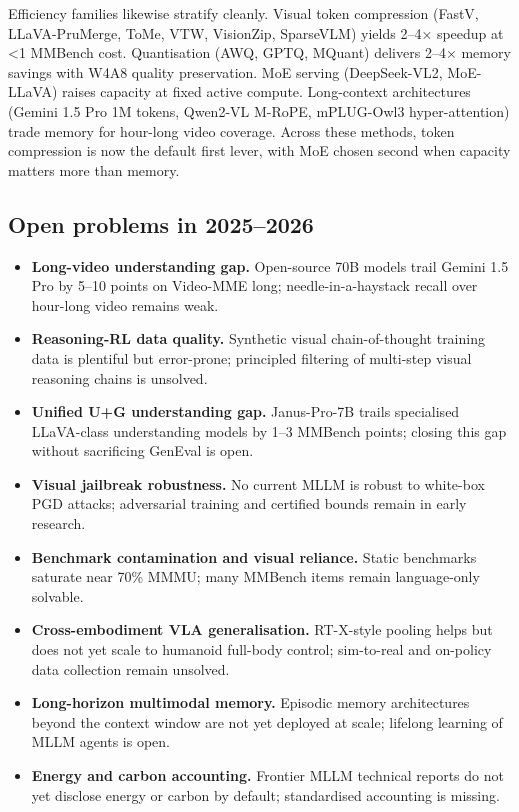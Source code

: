 Efficiency families likewise stratify cleanly. Visual token compression (FastV, LLaVA-PruMerge, ToMe, VTW, VisionZip, SparseVLM) yields 2--4× speedup at \textless1 MMBench cost. Quantisation (AWQ, GPTQ, MQuant) delivers 2--4× memory savings with W4A8 quality preservation. MoE serving (DeepSeek-VL2, MoE-LLaVA) raises capacity at fixed active compute. Long-context architectures (Gemini 1.5 Pro 1M tokens, Qwen2-VL M-RoPE, mPLUG-Owl3 hyper-attention) trade memory for hour-long video coverage. Across these methods, token compression is now the default first lever, with MoE chosen second when capacity matters more than memory.

\subsection{Open problems in 2025--2026}\label{open-problems-in-20252026}

\begin{itemize}
\tightlist
\item
  \textbf{Long-video understanding gap.} Open-source 70B models trail Gemini 1.5 Pro by 5--10 points on Video-MME long; needle-in-a-haystack recall over hour-long video remains weak.
\item
  \textbf{Reasoning-RL data quality.} Synthetic visual chain-of-thought training data is plentiful but error-prone; principled filtering of multi-step visual reasoning chains is unsolved.
\item
  \textbf{Unified U+G understanding gap.} Janus-Pro-7B trails specialised LLaVA-class understanding models by 1--3 MMBench points; closing this gap without sacrificing GenEval is open.
\item
  \textbf{Visual jailbreak robustness.} No current MLLM is robust to white-box PGD attacks; adversarial training and certified bounds remain in early research.
\item
  \textbf{Benchmark contamination and visual reliance.} Static benchmarks saturate near 70\% MMMU; many MMBench items remain language-only solvable.
\item
  \textbf{Cross-embodiment VLA generalisation.} RT-X-style pooling helps but does not yet scale to humanoid full-body control; sim-to-real and on-policy data collection remain unsolved.
\item
  \textbf{Long-horizon multimodal memory.} Episodic memory architectures beyond the context window are not yet deployed at scale; lifelong learning of MLLM agents is open.
\item
  \textbf{Energy and carbon accounting.} Frontier MLLM technical reports do not yet disclose energy or carbon by default; standardised accounting is missing.
\end{itemize}


